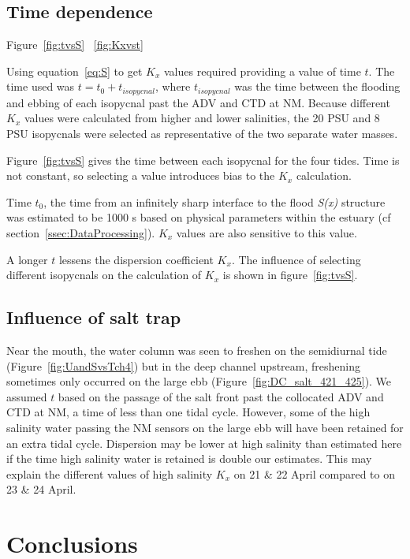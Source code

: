 \subsection{Time dependence}

Figure~\ref{fig:tvsS} ~\ref{fig:Kxvst}

Using equation~\ref{eq:S} to get $K_x$ values required providing a value of time $t$. The time used was $t=t_0 + t_{isopycnal}$, where $t_{isopycnal}$ was the time between the flooding and ebbing of each isopycnal past the ADV and CTD at NM. Because different $K_x$ values were calculated from higher and lower salinities, the 20 PSU and 8 PSU isopycnals were selected as representative of the two separate water masses. 

Figure~\ref{fig:tvsS} gives the time between each isopycnal for the four tides. Time is not constant, so selecting a value introduces bias to the $K_x$ calculation.

Time $t_0$, the time from an infinitely sharp interface to the flood \emph{S(x)} structure was estimated to be 1000 s based on physical parameters within the estuary (cf section~\ref{ssec:DataProcessing}). $K_x$ values are also sensitive to this value.

A longer $t$ lessens the dispersion coefficient $K_x$. The influence of selecting different isopycnals on the calculation of $K_x$ is shown in figure~\ref{fig:tvsS}. 

\subsection{Influence of salt trap}
Near the mouth, the water column was seen to freshen on the semidiurnal tide (Figure~\ref{fig:UandSvsTch4}) but in the deep channel upstream, freshening sometimes only occurred on the large ebb (Figure~\ref{fig:DC_salt_421_425}). We assumed $t$ based on the passage of the salt front past the collocated ADV and CTD at NM, a time of less than one tidal cycle. However, some of the high salinity water passing the NM sensors on the large ebb will have been retained for an extra tidal cycle. Dispersion may be lower at high salinity than estimated here if the time high salinity water is retained is double our estimates. This may explain the different values of high salinity $K_x$ on 21 \& 22 April compared to on 23 \& 24 April. 


\section{Conclusions}

